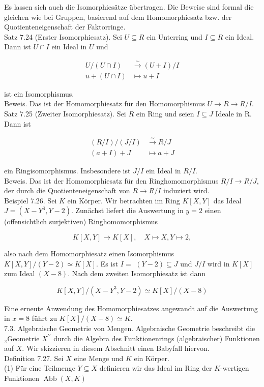 \documentclass[10pt, letterpaper]{article}
\begin{document}
Es lassen sich auch die Isomorphiesätze übertragen. Die Beweise sind formal die gleichen wie bei Gruppen, basierend auf dem Homomorphiesatz bzw. der Quotienteneigenschaft der Faktorringe.\\
Satz 7.24 (Erster Isomorphiesatz). Sei $U \subseteq R$ ein Unterring und $I \subseteq R$ ein Ideal.\\
Dann ist $U \cap I$ ein Ideal in $U$ und

$$
\begin{aligned}
U /(U \cap I) & \xrightarrow{\sim}(U+I) / I \\
u+(U \cap I) & \mapsto u+I
\end{aligned}
$$

ist ein Isomorphismus.\\
Beweis. Das ist der Homomorphiesatz für den Homomorphismus $U \rightarrow R \rightarrow R / I$.\\
Satz 7.25 (Zweiter Isomorphiesatz). Sei $R$ ein Ring und seien $I \subseteq J$ Ideale in R. Dann ist

$$
\begin{aligned}
(R / I) /(J / I) & \xrightarrow{\sim} R / J \\
(a+I)+J & \mapsto a+J
\end{aligned}
$$

ein Ringisomorphismus. Insbesondere ist $J / I$ ein Ideal in $R / I$.\\
Beweis. Das ist der Homomorphiesatz für den Ringhomomorphismus $R / I \rightarrow R / J$, der durch die Quotienteneigenschaft von $R \rightarrow R / I$ induziert wird.\\
Beispiel 7.26. Sei $K$ ein Körper. Wir betrachten im Ring $K[X, Y]$ das Ideal $J=\left(X-Y^{3}, Y-2\right)$. Zunächst liefert die Auswertung in $y=2$ einen (offensichtlich surjektiven) Ringhomomorphismus

$$
K[X, Y] \rightarrow K[X], \quad X \mapsto X, Y \mapsto 2,
$$

also nach dem Homomorphiesatz einen Isomorphismus $K[X, Y] /(Y-2) \simeq K[X]$. Es ist $I=$ $(Y-2) \subseteq J$ und $J / I$ wird in $K[X]$ zum Ideal $(X-8)$. Nach dem zweiten Isomorphiesatz ist dann

$$
K[X, Y] /\left(X-Y^{3}, Y-2\right) \simeq K[X] /(X-8)
$$

Eine erneute Anwendung des Homomorphiesatzes angewandt auf die Auswertung in $x=8$ führt zu $K[X] /(X-8) \simeq K$.\\
7.3. Algebraische Geometrie von Mengen. Algebraische Geometrie beschreibt die „Geometrie $X^{\prime \prime}$ durch die Algebra des Funktionenrings (algebraischer) Funktionen auf $X$. Wir skizzieren in diesem Abschnitt einen Babyfall hiervon.\\
Definition 7.27. Sei $X$ eine Menge und $K$ ein Körper.\\
(1) Für eine Teilmenge $Y \subseteq X$ definieren wir das Ideal im Ring der $K$-wertigen Funktionen $\operatorname{Abb}(X, K)$
\end{document}
